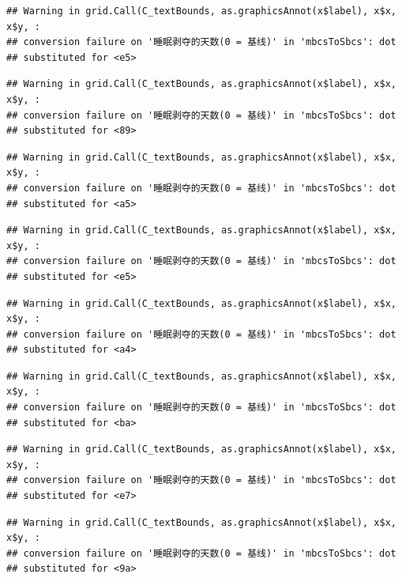 \documentclass[
]{book}
\begin{document}
\begin{verbatim}
## Warning in grid.Call(C_textBounds, as.graphicsAnnot(x$label), x$x, x$y, :
## conversion failure on '睡眠剥夺的天数(0 = 基线)' in 'mbcsToSbcs': dot
## substituted for <e5>
\end{verbatim}

\begin{verbatim}
## Warning in grid.Call(C_textBounds, as.graphicsAnnot(x$label), x$x, x$y, :
## conversion failure on '睡眠剥夺的天数(0 = 基线)' in 'mbcsToSbcs': dot
## substituted for <89>
\end{verbatim}

\begin{verbatim}
## Warning in grid.Call(C_textBounds, as.graphicsAnnot(x$label), x$x, x$y, :
## conversion failure on '睡眠剥夺的天数(0 = 基线)' in 'mbcsToSbcs': dot
## substituted for <a5>
\end{verbatim}

\begin{verbatim}
## Warning in grid.Call(C_textBounds, as.graphicsAnnot(x$label), x$x, x$y, :
## conversion failure on '睡眠剥夺的天数(0 = 基线)' in 'mbcsToSbcs': dot
## substituted for <e5>
\end{verbatim}

\begin{verbatim}
## Warning in grid.Call(C_textBounds, as.graphicsAnnot(x$label), x$x, x$y, :
## conversion failure on '睡眠剥夺的天数(0 = 基线)' in 'mbcsToSbcs': dot
## substituted for <a4>
\end{verbatim}

\begin{verbatim}
## Warning in grid.Call(C_textBounds, as.graphicsAnnot(x$label), x$x, x$y, :
## conversion failure on '睡眠剥夺的天数(0 = 基线)' in 'mbcsToSbcs': dot
## substituted for <ba>
\end{verbatim}

\begin{verbatim}
## Warning in grid.Call(C_textBounds, as.graphicsAnnot(x$label), x$x, x$y, :
## conversion failure on '睡眠剥夺的天数(0 = 基线)' in 'mbcsToSbcs': dot
## substituted for <e7>
\end{verbatim}

\begin{verbatim}
## Warning in grid.Call(C_textBounds, as.graphicsAnnot(x$label), x$x, x$y, :
## conversion failure on '睡眠剥夺的天数(0 = 基线)' in 'mbcsToSbcs': dot
## substituted for <9a>
\end{verbatim}
\end{document}
